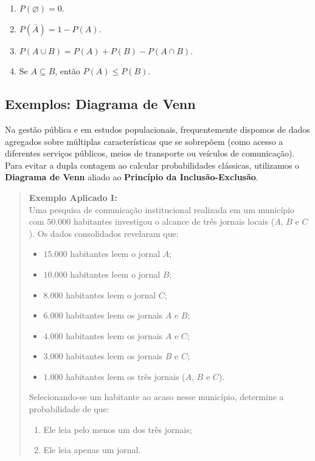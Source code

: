 \begin{enumerate}
\item $P(\varnothing)=0$.
\item $P(\bar{A})=1-P(A)$.
\item $P(A\cup B)=P(A)+P(B)-P(A\cap B)$.
\item Se $A\subseteq B$, então $P(A)\leq P(B)$.
\end{enumerate}


\subsection{Exemplos: \textbf{Diagrama de Venn}}

Na gestão pública e em estudos populacionais, frequentemente dispomos de dados agregados sobre múltiplas características que se sobrepõem (como acesso a diferentes serviços públicos, meios de transporte ou veículos de comunicação). Para evitar a dupla contagem ao calcular probabilidades clássicas, utilizamos o \textbf{Diagrama de Venn} aliado ao \textbf{Princípio da Inclusão-Exclusão}.

\begin{quote}
\textbf{Exemplo Aplicado I:} \\
Uma pesquisa de comunicação institucional realizada em um município com $50.000$ habitantes investigou o alcance de três jornais locais ($A$, $B$ e $C$). Os dados consolidados revelaram que:
\begin{itemize}
    \item $15.000$ habitantes leem o jornal $A$;
    \item $10.000$ habitantes leem o jornal $B$;
    \item $8.000$ habitantes leem o jornal $C$;
    \item $6.000$ habitantes leem os jornais $A$ e $B$;
    \item $4.000$ habitantes leem os jornais $A$ e $C$;
    \item $3.000$ habitantes leem os jornais $B$ e $C$;
    \item $1.000$ habitantes leem os três jornais ($A$, $B$ e $C$).
\end{itemize}
Selecionando-se um habitante ao acaso nesse município, determine a probabilidade de que:
\begin{enumerate}
    \item[a)] Ele leia pelo menos um dos três jornais;
    \item[b)] Ele leia apenas um jornal.
\end{enumerate}
\end{quote}


